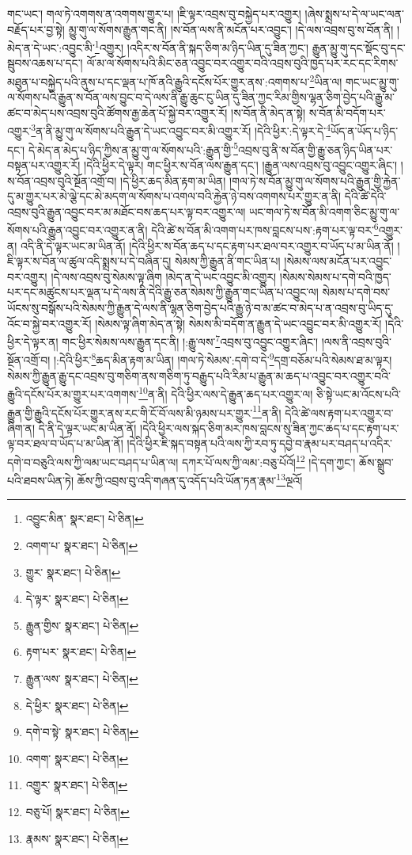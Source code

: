 གང་ཡང་། གལ་ཏེ་འགགས་ན་འགགས་གྱུར་པ། །ཇི་ལྟར་འབྲས་བུ་བསྐྱེད་པར་འགྱུར། །ཞེས་སྨྲས་པ་དེ་ལ་ཡང་ལན་བརྗོད་པར་བྱ་སྟེ། མྱུ་གུ་ལ་སོགས་རྒྱུན་གང་ནི། །ས་བོན་ལས་ནི་མངོན་པར་འབྱུང་། །དེ་ལས་འབྲས་བུ་ས་བོན་ནི། །མེད་ན་དེ་ཡང་:འབྱུང་མི་\footnote{འབྱུང་མིན་  སྣར་ཐང་།  པེ་ཅིན། }འགྱུར། །འདིར་ས་བོན་ནི་སྐད་ཅིག་མ་ཉིད་ཡིན་དུ་ཟིན་ཀྱང་། རྒྱུན་མྱུ་གུ་དང་སྡོང་བུ་དང་སྦུབས་འཆས་པ་དང་། ལོ་མ་ལ་སོགས་པའི་མིང་ཅན་འབྱུང་བར་འགྱུར་བའི་འབྲས་བུའི་ཁྱད་པར་རང་དང་རིགས་མཐུན་པ་བསྐྱེད་པའི་ནུས་པ་དང་ལྡན་པ་ཁོ་ནའི་རྒྱུའི་དངོས་པོར་གྱུར་ནས་:འགགས་པ་\footnote{འགག་པ་  སྣར་ཐང་།  པེ་ཅིན། }ཡིན་ལ། གང་ཡང་མྱུ་གུ་ལ་སོགས་པའི་རྒྱུན་ས་བོན་ལས་བྱུང་བ་དེ་ལས་ནི་རྒྱུ་ཆུང་ངུ་ཡིན་དུ་ཟིན་ཀྱང་རིམ་གྱིས་ལྷན་ཅིག་བྱེད་པའི་རྒྱུ་མ་ཚང་བ་མེད་པས་འབྲས་བུའི་ཚོགས་རྒྱ་ཆེན་པོ་སྐྱེ་བར་འགྱུར་རོ། །ས་བོན་ནི་མེད་ན་སྟེ། ས་བོན་མི་བདོག་པར་འགྱུར་\footnote{གྱུར་  སྣར་ཐང་།  པེ་ཅིན། }ན་ནི་མྱུ་གུ་ལ་སོགས་པའི་རྒྱུན་དེ་ཡང་འབྱུང་བར་མི་འགྱུར་རོ། །དེའི་ཕྱིར་:དེ་ལྟར་དེ་\footnote{དེ་ལྟར་  སྣར་ཐང་།  པེ་ཅིན། }ཡོད་ན་ཡོད་པ་ཉིད་དང་། དེ་མེད་ན་མེད་པ་ཉིད་ཀྱིས་ན་མྱུ་གུ་ལ་སོགས་པའི་:རྒྱུན་གྱི་\footnote{རྒྱུན་གྱིས་  སྣར་ཐང་།  པེ་ཅིན། }འབྲས་བུ་ནི་ས་བོན་གྱི་རྒྱུ་ཅན་ཉིད་ཡིན་པར་བསྟན་པར་འགྱུར་རོ། །དེའི་ཕྱིར་དེ་ལྟར། གང་ཕྱིར་ས་བོན་ལས་རྒྱུན་དང་། །རྒྱུན་ལས་འབྲས་བུ་འབྱུང་འགྱུར་ཞིང་། །ས་བོན་འབྲས་བུའི་སྔོན་འགྲོ་བ། །དེ་ཕྱིར་ཆད་མིན་རྟག་མ་ཡིན། །གལ་ཏེ་ས་བོན་མྱུ་གུ་ལ་སོགས་པའི་རྒྱུན་གྱི་རྐྱེན་དུ་མ་གྱུར་པར་མེ་ལྕེ་དང་མེ་མདག་ལ་སོགས་པ་འགལ་བའི་རྐྱེན་ཉེ་བས་འགགས་པར་གྱུར་ན་ནི། དེའི་ཚེ་དེའི་འབྲས་བུའི་རྒྱུན་འབྱུང་བར་མ་མཐོང་བས་ཆད་པར་ལྟ་བར་འགྱུར་ལ། ཡང་གལ་ཏེ་ས་བོན་མི་འགག་ཅིང་མྱུ་གུ་ལ་སོགས་པའི་རྒྱུན་འབྱུང་བར་འགྱུར་ན་ནི། དེའི་ཚེ་ས་བོན་མི་འགག་པར་ཁས་བླངས་པས་:རྟག་པར་ལྟ་བར་\footnote{རྟག་པར་  སྣར་ཐང་།  པེ་ཅིན། }འགྱུར་ན། འདི་ནི་དེ་ལྟར་ཡང་མ་ཡིན་ནོ། །དེའི་ཕྱིར་ས་བོན་ཆད་པ་དང་རྟག་པར་ཐལ་བར་འགྱུར་བ་ཡོད་པ་མ་ཡིན་ནོ། །ཇི་ལྟར་ས་བོན་ལ་ཚུལ་འདི་སྨྲས་པ་དེ་བཞིན་དུ། སེམས་ཀྱི་རྒྱུན་ནི་གང་ཡིན་པ། །སེམས་ལས་མངོན་པར་འབྱུང་བར་འགྱུར། །དེ་ལས་འབྲས་བུ་སེམས་ལྟ་ཞིག །མེད་ན་དེ་ཡང་འབྱུང་མི་འགྱུར། །སེམས་སེམས་པ་དགེ་བའི་ཁྱད་པར་དང་མཚུངས་པར་ལྡན་པ་དེ་ལས་ནི་དེའི་རྒྱུ་ཅན་སེམས་ཀྱི་རྒྱུན་གང་ཡིན་པ་འབྱུང་ལ། སེམས་པ་དགེ་བས་ཡོངས་སུ་བསྒོས་པའི་སེམས་ཀྱི་རྒྱུན་དེ་ལས་ནི་ལྷན་ཅིག་བྱེད་པའི་རྒྱུ་ཉེ་བ་མ་ཚང་བ་མེད་པ་ན་འབྲས་བུ་ཡིད་དུ་འོང་བ་སྐྱེ་བར་འགྱུར་རོ། །སེམས་ལྟ་ཞིག་མེད་ན་སྟེ། སེམས་མི་བདོག་ན་རྒྱུན་དེ་ཡང་འབྱུང་བར་མི་འགྱུར་རོ། །དེའི་ཕྱིར་དེ་ལྟར་ན། གང་ཕྱིར་སེམས་ལས་རྒྱུན་དང་ནི། །:རྒྱུ་ལས་\footnote{རྒྱུན་ལས་  སྣར་ཐང་།  པེ་ཅིན། }འབྲས་བུ་འབྱུང་འགྱུར་ཞིང་། །ལས་ནི་འབྲས་བུའི་སྔོན་འགྲོ་བ། །:དེའི་ཕྱིར་\footnote{དེ་ཕྱིར་  སྣར་ཐང་།  པེ་ཅིན། }ཆད་མིན་རྟག་མ་ཡིན། །གལ་ཏེ་སེམས་:དགེ་བ་དེ་\footnote{དགེ་བ་སྟེ་  སྣར་ཐང་།  པེ་ཅིན། }དགྲ་བཅོམ་པའི་སེམས་ཐ་མ་ལྟར། སེམས་ཀྱི་རྒྱུན་རྒྱུ་དང་འབྲས་བུ་གཅིག་ནས་གཅིག་ཏུ་བརྒྱུད་པའི་རིམ་པ་རྒྱུན་མ་ཆད་པ་འབྱུང་བར་འགྱུར་བའི་རྒྱུའི་དངོས་པོར་མ་གྱུར་པར་འགགས་\footnote{འགག་  སྣར་ཐང་།  པེ་ཅིན། }ན་ནི། དེའི་ཕྱིར་ལས་དེ་རྒྱུན་ཆད་པར་འགྱུར་ལ། ཅི་སྟེ་ཡང་མ་འོངས་པའི་རྒྱུན་གྱི་རྒྱུའི་དངོས་པོར་གྱུར་ནས་རང་གི་ངོ་བོ་ལས་མི་ཉམས་པར་གྱུར་\footnote{འགྱུར་  སྣར་ཐང་།  པེ་ཅིན། }ན་ནི། དེའི་ཚེ་ལས་རྟག་པར་འགྱུར་བ་ཞིག་ན། དེ་ནི་དེ་ལྟར་ཡང་མ་ཡིན་ནོ། །དེའི་ཕྱིར་ལས་སྐད་ཅིག་མར་ཁས་བླངས་སུ་ཟིན་ཀྱང་ཆད་པ་དང་རྟག་པར་ལྟ་བར་ཐལ་བ་ཡོད་པ་མ་ཡིན་ནོ། །དེའི་ཕྱིར་ཇི་སྐད་བསྟན་པའི་ལས་ཀྱི་རབ་ཏུ་དབྱེ་བ་རྣམ་པར་བཤད་པ་འདིར་དགེ་བ་བཅུའི་ལས་ཀྱི་ལམ་ཡང་བཤད་པ་ཡིན་ལ། དཀར་པོ་ལས་ཀྱི་ལམ་:བཅུ་པོའོ།\footnote{བཅུ་པོ།  སྣར་ཐང་།  པེ་ཅིན། } །དེ་དག་ཀྱང་། ཆོས་སྒྲུབ་པའི་ཐབས་ཡིན་ཏེ། ཆོས་ཀྱི་འབྲས་བུ་འདི་གཞན་དུ་འདོད་པའི་ཡོན་ཏན་རྣམ་\footnote{རྣམས་  སྣར་ཐང་།  པེ་ཅིན། }ལྔའོ། 